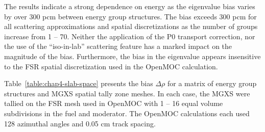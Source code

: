 \begin{table}[h!]
\begin{tabular}{c S[table-format=6.1] S[table-format=6.1] S[table-format=6.1] S[table-format=6.1] S[table-format=6.1]}
  \bottomrule
\end{tabular}
\end{table}

The results indicate a strong dependence on energy as the eigenvalue bias varies by over 300 pcm between energy group structures. The bias exceeds 300 pcm for all scattering approximations and spatial discretizations as the number of groups increase from 1 -- 70. Neither the application of the P0 transport correction, nor the use of the ``iso-in-lab'' scattering feature has a marked impact on the magnitude of the bias. Furthermore, the bias in the eigenvalue appears insensitive to the \ac{FSR} spatial discretization used in the OpenMOC calculation.

Table~\ref{table:chap4-slab-space} presents the bias $\Delta\rho$ for a matrix of energy group structures and \ac{MGXS} spatial tally zone meshes. In each case, the \ac{MGXS} were tallied on the \ac{FSR} mesh used in OpenMOC with 1 -- 16 equal volume subdivisions in the fuel and moderator. The OpenMOC calculations each used 128 azimuthal angles and 0.05 cm track spacing.

